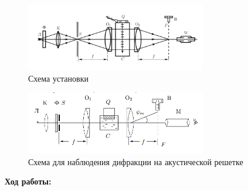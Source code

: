 \documentclass[a4paper, 12pt]{article}%
\begin{document}
	\begin{figure}[h!]
		\centering	
		\includegraphics[width=0.7\textwidth]{stand.png}
		\caption{Схема установки}
		\label{shema1}
	\end{figure}

	\begin{figure}[h!]
	\centering	
	\includegraphics[width=0.7\textwidth]{acustic.png}
	\caption{Схема для наблюдения дифракции на акустической решетке}
	\end{figure}

	\newpage
	\textbf{Ход работы: }\\
	
\end{document}
